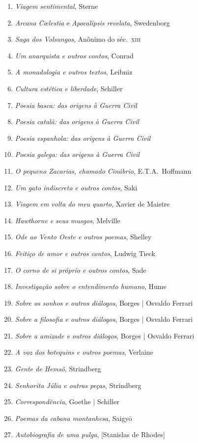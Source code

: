 \begin{enumerate}
\item \textit{Viagem sentimental}, Sterne
\item \textit{Arcana C\oe lestia} e \textit{Apocalipsis revelata}, Swedenborg
\item \textit{Saga dos Volsungos}, Anônimo do séc.~\textsc{xiii}
\item \textit{Um anarquista e outros contos}, Conrad
\item \textit{A monadologia e outros textos}, Leibniz
\item \textit{Cultura estética e liberdade}, Schiller
\item \textit{Poesia basca: das origens à Guerra Civil} 
\item \textit{Poesia catalã: das origens à Guerra Civil} 
\item \textit{Poesia espanhola: das origens à Guerra Civil} 
\item \textit{Poesia galega: das origens à Guerra Civil} 
\item \textit{O pequeno Zacarias, chamado Cinábrio}, E.T.A.~Hoffmann
\item \textit{Um gato indiscreto e outros contos}, Saki
\item \textit{Viagem em volta do meu quarto}, Xavier de Maistre 
\item \textit{Hawthorne e seus musgos}, Melville
\item \textit{Ode ao Vento Oeste e outros poemas}, Shelley
\item \textit{Feitiço de amor e outros contos}, Ludwig Tieck
\item \textit{O corno de si próprio e outros contos}, Sade
\item \textit{Investigação sobre o entendimento humano}, Hume
\item \textit{Sobre os sonhos e outros diálogos}, Borges | Osvaldo Ferrari
\item \textit{Sobre a filosofia e outros diálogos}, Borges | Osvaldo Ferrari
\item \textit{Sobre a amizade e outros diálogos}, Borges | Osvaldo Ferrari
\item \textit{A voz dos botequins e outros poemas}, Verlaine 
\item \textit{Gente de Hemsö}, Strindberg 
\item \textit{Senhorita Júlia e outras peças}, Strindberg 
\item \textit{Correspondência}, Goethe | Schiller
\item \textit{Poemas da cabana montanhesa}, Saigy\=o
\item \textit{Autobiografia de uma pulga}, [Stanislas de Rhodes]

\end{enumerate}
